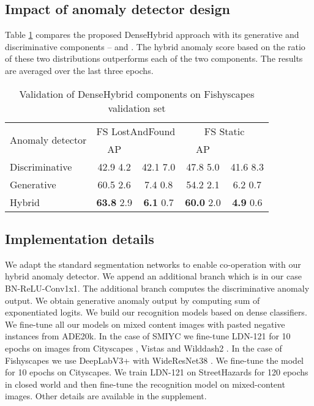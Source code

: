 \documentclass[runningheads]{llncs}
\begin{document}
\subsection{Impact of anomaly detector design}
Table \ref{table:abl_sx} compares the proposed DenseHybrid approach with its generative and discriminative components --  and .
The hybrid anomaly score based on the ratio of these two distributions outperforms each of the two components.
The results are averaged over the last three epochs.
\begin{table}[h]
\begin{center}
\caption{Validation of DenseHybrid components on Fishyscapes validation set}
\label{table:abl_sx}
\begin{tabular}{lcccc}
\hline \hline
\multirow{2}{*}{Anomaly detector} & \multicolumn{2}{c|}{FS LostAndFound} & \multicolumn{2}{c}{FS Static} \\
 & AP & \multicolumn{1}{c|}{}  & AP &  \\ \hline \hline
Discriminative  & 42.9  4.2 & 42.1  7.0 & 47.8  5.0 & 41.6  8.3 \\
Generative  & 60.5  2.6&  7.4  0.8 & 54.2  2.1 & 6.2  0.7\\
Hybrid   & \textbf{63.8}  2.9 & \textbf{6.1}  0.7 & \textbf{60.0}  2.0 & \textbf{4.9}  0.6 \\ \hline
\end{tabular}
\end{center}
\end{table}

\subsection{Implementation details}
We adapt the standard segmentation networks \cite{kreso21tits,zhu19cvpr} to enable co-operation with our hybrid anomaly detector.
We append an additional branch  which is in our case BN-ReLU-Conv1x1. The additional branch computes the discriminative anomaly output.
We obtain generative anomaly output by computing sum of exponentiated logits.
We build our recognition models based on dense classifiers.
We fine-tune all our models on mixed content images with pasted negative instances from ADE20k.
In the case of SMIYC we fine-tune LDN-121 \cite{kreso21tits} for 10 epochs on images from Cityscapes \cite{cordts16cvpr}, Vistas \cite{neuhold17iccv} and Wilddash2 \cite{zendel18eccv}.
In the case of Fishyscapes we use DeepLabV3+ with WideResNet38 \cite{zhu19cvpr}.
We fine-tune the model for 10 epochs on Cityscapes.
We train LDN-121 on StreetHazards for 120 epochs in closed world and then fine-tune the recognition model on mixed-content images.
Other details are available in the supplement.
\end{document}
